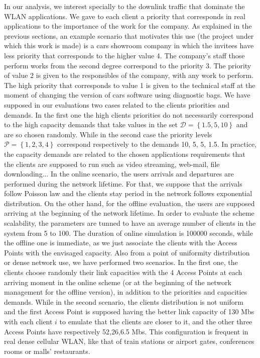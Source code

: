 \documentclass[journal,transmag]{IEEEtran}
\begin{document}
In our analysis, we interest specially to the downlink traffic that dominate the WLAN applications. We gave to each client a priority that corresponds in real applications to the importance of the work for the company. As explained in the previous sections, an example scenario that motivates this use (the project under which this work is made) is a cars showroom company in which the invitees have less priority that corresponds to the higher value 4. The company's staff those perform works from the second degree correspond to the priority 3. The priority of value 2 is given to the responsibles of the company, with any work to perform. The high priority that corresponds to value 1 is given to the technical staff at the moment of changing the version of cars software using diagnostic bags.
We have supposed in our evaluations two cases related to the clients priorities and demands. In the first one the high clients priorities do not necessarily correspond to the high capacity demands that take values in the set $\mathscr{D}=\left\{1.5, 5, 10 \right\}$ and are so chosen randomly. While in the second case the priority levels $\mathscr{P}=\left\{ 1,2,3,4\right\}$ correspond respectively to the demands 10, 5, 5, 1.5. In practice, the capacity demands are related to the chosen applications requirements that the clients are supposed to run such as video streaming, web-mail, file downloading...
In the online scenario, the users arrivals and departures are performed during the network lifetime. For that, we suppose that the arrivals follow Poisson law and the clients stay period in the network follows exponential distribution. On the other hand, for the offline evaluation, the users are supposed arriving at the beginning of the network lifetime. In order to evaluate the scheme scalability, the parameters are tunned to have an average number of clients in the system from 5 to 100. The duration of online simulation is 100000 seconds, while the offline one is immediate, as we just associate the clients with the Access Points with the envisaged capacity. 
Also from a point of uniformity distribution or dense network use, we have performed two scenarios. In the first one, the clients choose randomly their link capacities with the 4 Access Points at each arriving moment in the online scheme (or at the beginning of the network management for the offline version), in addition to the priorities and capacities demands. While in the second scenario, the clients distribution is not uniform and the first Access Point is supposed having the better link capacity of 130 Mbs with each client $i$ to emulate that the clients are closer to it, and the other three Access Points have respectively 52,26,6.5 Mbs. This configuration is frequent in real dense cellular WLAN, like that of train stations or airport gates, conferences rooms or malls' restaurants.   
\end{document}
